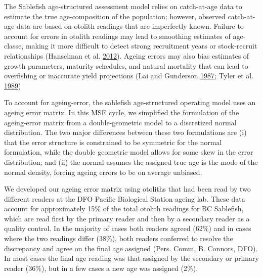 \documentclass[11pt]{book}
\begin{document}
The Sablefish age-structured assessment model relies on catch-at-age data to estimate the true age-composition of the population; however, observed catch-at-age data are based on otolith readings that are imperfectly known. Failure to account for errors in otolith readings may lead to smoothing estimates of age-classe, making it more difficult to detect strong recruitment years or stock-recruit relationships (Hanselman et al. \protect\hyperlink{ref-hanselman2012statistical}{2012}). Ageing errors may also bias estimates of growth parameters, maturity schedules, and natural mortality that can lead to overfishing or inaccurate yield projections (Lai and Gunderson \protect\hyperlink{ref-lai1987effects}{1987}; Tyler et al. \protect\hyperlink{ref-tyler1989implications}{1989})

To account for ageing-error, the sablefish age-structured operating model uses an ageing error matrix. In this MSE cycle, we simplified the formulation of the ageing-error matrix from a double-geometric model to a discretized normal distribution. The two major differences between these two formulations are (i) that the error structure is constrained to be symmetric for the normal formulation, while the double geometric model allows for some skew in the error distribution; and (ii) the normal assumes the assigned true age is the mode of the normal density, forcing ageing errors to be on average unbiased.

We developed our ageing error matrix using otoliths that had been read by two different readers at the DFO Pacific Biological Station ageing lab. These data account for approximately 15\% of the total otolith readings for BC Sablefish, which are read first by the primary reader and then by a secondary reader as a quality control. In the majority of cases both readers agreed (62\%) and in cases where the two readings differ (38\%), both readers conferred to resolve the discrepancy and agree on the final age assigned (Pers. Comm, B. Connors, DFO). In most cases the final age reading was that assigned by the secondary or primary reader (36\%), but in a few cases a new age was assigned (2\%).
\end{document}
